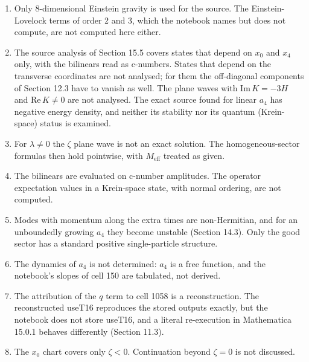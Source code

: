 \documentclass[11pt]{article}
\begin{document}
\begin{enumerate}
\item Only 8-dimensional Einstein gravity is used for the source. The Einstein-Lovelock terms of order 2 and 3, which the notebook names but does not compute, are not computed here either.
\item The source analysis of Section 15.5 covers states that depend on $x_0$ and $x_4$ only, with the bilinears read as c-numbers. States that depend on the transverse coordinates are not analysed; for them the off-diagonal components of Section 12.3 have to vanish as well. The plane waves with $\mathrm{Im}\,K=-3H$ and $\mathrm{Re}\,K\ne0$ are not analysed. The exact source found for linear $a_4$ has negative energy density, and neither its stability nor its quantum (Krein-space) status is examined.
\item For $\lambda\ne0$ the $\zeta$ plane wave is not an exact solution. The homogeneous-sector formulas then hold pointwise, with $M_{\mathrm{eff}}$ treated as given.
\item The bilinears are evaluated on c-number amplitudes. The operator expectation values in a Krein-space state, with normal ordering, are not computed.
\item Modes with momentum along the extra times are non-Hermitian, and for an unboundedly growing $a_4$ they become unstable (Section 14.3). Only the good sector has a standard positive single-particle structure.
\item The dynamics of $a_4$ is not determined: $a_4$ is a free function, and the notebook's slopes of cell 150 are tabulated, not derived.
\item The attribution of the $q$ term to cell 1058 is a reconstruction. The reconstructed useT16 reproduces the stored outputs exactly, but the notebook does not store useT16, and a literal re-execution in Mathematica 15.0.1 behaves differently (Section 11.3).
\item The $x_0$ chart covers only $\zeta<0$. Continuation beyond $\zeta=0$ is not discussed.
\end{enumerate}
\end{document}
